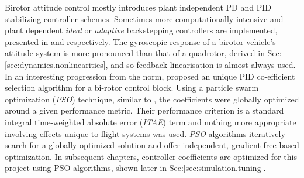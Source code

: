 Birotor attitude control mostly introduces plant independent PD \cite{obliquepitch} and PID \cite{tiltrotorUAV} stabilizing controller schemes. Sometimes more computationally intensive and plant dependent \emph{ideal} or \emph{adaptive} backstepping controllers are implemented, presented in \cite{smalltwotilting,tpheonix} and \cite{adaptivebackstep} respectively. The gyroscopic response of a birotor vehicle's attitude system is more pronounced than that of a quadrotor, derived in Sec:\ref{sec:dynamics.nonlinearities}, and so feedback linearisation is almost always used. In an interesting progression from the norm, \cite{autopilotPSO} proposed an unique PID co-efficient selection algorithm for a bi-rotor control block. Using a particle swarm optimization (\emph{PSO}) technique, similar to \cite{adaptivepso}, the coefficients were globally optimized around a given performance metric. Their performance criterion is a standard integral time-weighted absolute error (\emph{ITAE}) term and nothing more appropriate involving effects unique to flight systems was used. \emph{PSO} algorithms iteratively search for a globally optimized solution and offer independent, gradient free based optimization. In subsequent chapters, controller coefficients are optimized for this project using PSO algorithms, shown later in Sec:\ref{sec:simulation.tuning}.
\par
